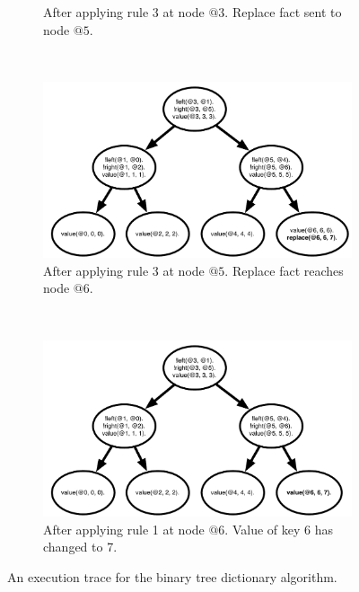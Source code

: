 \begin{figure}[]
\begin{subfigure}[b]{0.45\textwidth}
                \caption{After applying rule 3 at node $@3$. Replace fact sent to node $@5$.}
                \label{fig:btree_trace2}
        \end{subfigure}\\
        \begin{subfigure}[b]{0.45\textwidth}
                \includegraphics[width=\textwidth]{btree_trace3}
                \caption{After applying rule 3 at node $@5$. Replace fact reaches node $@6$.}
                \label{fig:btree_trace3}
        \end{subfigure}%
        ~
        \begin{subfigure}[b]{0.45\textwidth}
                  \includegraphics[width=\textwidth]{btree_trace4}
                  \caption{After applying rule 1 at node $@6$. Value of key 6 has changed to 7.}
                  \label{fig:btree_trace4}
          \end{subfigure}
        \caption{An execution trace for the binary tree dictionary algorithm.}\label{fig:btree_trace}
\end{figure}

